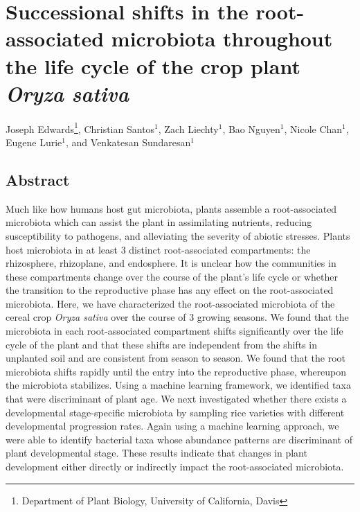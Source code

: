 \chapter{Successional shifts in the root-associated microbiota throughout the life cycle of the crop plant \textit{Oryza sativa}}

Joseph Edwards\footnote[1]{Department of Plant Biology, University of California, Davis}, Christian Santos$^1$, Zach Liechty$^1$, Bao Nguyen$^1$, Nicole Chan$^1$, Eugene Lurie$^1$, and Venkatesan Sundaresan$^1$

\section{Abstract}
Much like how humans host gut microbiota, plants assemble a root-associated microbiota which can assist the plant in assimilating nutrients, reducing susceptibility to pathogens, and alleviating the severity of abiotic stresses. Plants host microbiota in at least 3 distinct root-associated compartments: the rhizosphere, rhizoplane, and endosphere. It is unclear how the communities in these compartments change over the course of the plant's life cycle or whether the transition to the reproductive phase has any effect on the root-associated microbiota. Here, we have characterized the root-associated microbiota of the cereal crop \textit{Oryza sativa} over the course of 3 growing seasons. We found that the microbiota in each root-associated compartment shifts significantly over the life cycle of the plant and that these shifts are independent from the shifts in unplanted soil and are consistent from season to season. We found that the root microbiota shifts rapidly until the entry into the reproductive phase, whereupon the microbiota stabilizes. Using a machine learning framework, we identified taxa that were discriminant of plant age. We next investigated whether there exists a developmental stage-specific microbiota by sampling rice varieties with different developmental progression rates. Again using a machine learning approach, we were able to identify bacterial taxa whose abundance patterns are discriminant of plant developmental stage. These results indicate that changes in plant development either directly or indirectly impact the root-associated microbiota.

